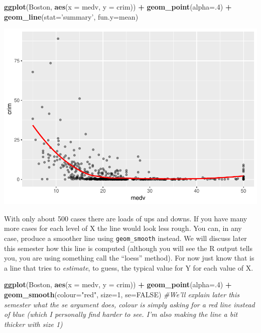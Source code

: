\documentclass[]{book}
\newenvironment{Shaded}{\begin{snugshade}}{\end{snugshade}}
\newcommand{\CommentTok}[1]{\textcolor[rgb]{0.56,0.35,0.01}{\textit{#1}}}
\newcommand{\DataTypeTok}[1]{\textcolor[rgb]{0.13,0.29,0.53}{#1}}
\newcommand{\DecValTok}[1]{\textcolor[rgb]{0.00,0.00,0.81}{#1}}
\newcommand{\KeywordTok}[1]{\textcolor[rgb]{0.13,0.29,0.53}{\textbf{#1}}}
\newcommand{\NormalTok}[1]{#1}
\newcommand{\OperatorTok}[1]{\textcolor[rgb]{0.81,0.36,0.00}{\textbf{#1}}}
\newcommand{\OtherTok}[1]{\textcolor[rgb]{0.56,0.35,0.01}{#1}}
\newcommand{\StringTok}[1]{\textcolor[rgb]{0.31,0.60,0.02}{#1}}
\theoremstyle{definition}
\theoremstyle{definition}
\theoremstyle{definition}
\theoremstyle{remark}
\begin{document}
\begin{Shaded}
\begin{Highlighting}[]
\KeywordTok{ggplot}\NormalTok{(Boston, }\KeywordTok{aes}\NormalTok{(}\DataTypeTok{x =}\NormalTok{ medv, }\DataTypeTok{y =}\NormalTok{ crim)) }\OperatorTok{+}
\StringTok{  }\KeywordTok{geom_point}\NormalTok{(}\DataTypeTok{alpha=}\NormalTok{.}\DecValTok{4}\NormalTok{) }\OperatorTok{+}
\StringTok{  }\KeywordTok{geom_line}\NormalTok{(}\DataTypeTok{stat=}\StringTok{'summary'}\NormalTok{, }\DataTypeTok{fun.y=}\NormalTok{mean)}
\end{Highlighting}
\end{Shaded}

\includegraphics{03-visualisation_files/figure-latex/unnamed-chunk-42-1.pdf}

With only about 500 cases there are loads of ups and downs. If you have
many more cases for each level of X the line would look less rough. You
can, in any case, produce a smoother line using \texttt{geom\_smooth}
instead. We will discuss later this semester how this line is computed
(although you will see the R output tells you, you are using something
call the ``loess'' method). For now just know that is a line that tries
to \emph{estimate}, to guess, the typical value for Y for each value of
X.

\begin{Shaded}
\begin{Highlighting}[]
\KeywordTok{ggplot}\NormalTok{(Boston, }\KeywordTok{aes}\NormalTok{(}\DataTypeTok{x =}\NormalTok{ medv, }\DataTypeTok{y =}\NormalTok{ crim)) }\OperatorTok{+}
\StringTok{  }\KeywordTok{geom_point}\NormalTok{(}\DataTypeTok{alpha=}\NormalTok{.}\DecValTok{4}\NormalTok{) }\OperatorTok{+}
\StringTok{  }\KeywordTok{geom_smooth}\NormalTok{(}\DataTypeTok{colour=}\StringTok{"red"}\NormalTok{, }\DataTypeTok{size=}\DecValTok{1}\NormalTok{, }\DataTypeTok{se=}\OtherTok{FALSE}\NormalTok{) }\CommentTok{#We'll explain later this semester what the se argument does, colour is simply asking for a red line instead of blue (which I personally find harder to see. I'm also making the line a bit thicker with size 1)}
\end{Highlighting}
\end{Shaded}
\end{document}
